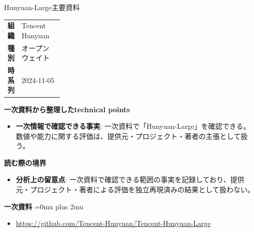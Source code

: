 \begin{technicalnote}{Hunyuan-Large}{主要資料}
\begingroup
\begin{tabularx}{\linewidth}{@{}>{\bfseries}p{0.22\linewidth}X@{}}
組織 & Tencent Hunyuan \\
種別 & オープンウェイト \\
時系列 & 2024-11-05 \\
\end{tabularx}
\smallskip
{\bfseries 一次資料から整理したtechnical points}
\begin{itemize}[leftmargin=1.5em,itemsep=0.35em]
\item \textbf{一次情報で確認できる事実}: 一次資料で「Hunyuan-Large」を確認できる。数値や能力に関する評価は、提供元・プロジェクト・著者の主張として扱う。
\end{itemize}
\begin{minipage}{\linewidth}
{\bfseries 読む際の境界}
\begin{itemize}[leftmargin=1.5em,itemsep=0.35em]
\item \textbf{分析上の留意点}: 一次資料で確認できる範囲の事実を記録しており、提供元・プロジェクト・著者による評価を独立再現済みの結果として扱わない。
\end{itemize}
\begin{samepage}
{\bfseries 一次資料}
\begingroup\sloppy
\Urlmuskip=0mu plus 2mu\relax
\begin{itemize}[leftmargin=1.5em,itemsep=0.25em]
\item {\scriptsize\url{https://github.com/Tencent-Hunyuan/Tencent-Hunyuan-Large}}
\end{itemize}
\endgroup
\end{samepage}
\end{minipage}
\endgroup
\end{technicalnote}
\medskip

